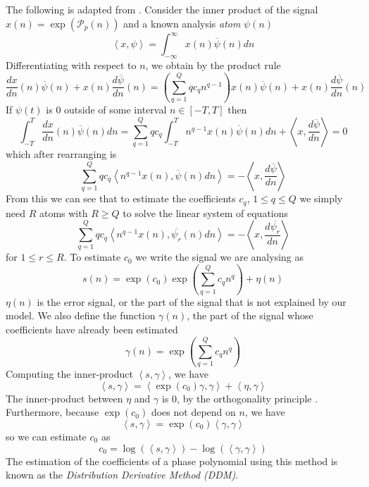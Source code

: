 The following is adapted from \cite{betser2009sinusoidal}. Consider the inner
product of the signal $x(n) = \exp(\mathcal{P}_p(n)) $ and a
known analysis \textit{atom} $\psi(n)$
\[
    \left\langle x,\psi \right\rangle =
    \int_{-\infty}^{\infty}x(n)\overline{\psi}(n)dn
\]
Differentiating with respect to $n$, we obtain by the product rule
\[
    \frac{dx}{dn}(n)\overline{\psi}(n)
    + x(n)\frac{d\overline{\psi}}{dn}(n)
    = \left( \sum_{q=1}^{Q} q c_q n^{q-1} \right) x(n)\overline{\psi}(n)
    + x(n)\frac{d\overline{\psi}}{dn}(n)
\]
If $\psi(t)$ is 0 outside of some interval $n \in [-T,T]$ then
\[
    \int_{-T}^{T} \frac{dx}{dn}(n)\overline{\psi}(n) dn
    = \sum_{q=1}^{Q} q c_q \int_{-T}^{T} n^{q-1} x(n) \overline{\psi}(n) dn
    + \left\langle x, \frac{d\overline{\psi}}{dn} \right\rangle = 0
\]
which after rearranging is
\[ 
    \sum_{q=1}^{Q} q c_q 
    \left\langle n^{q-1} x(n) , \overline{\psi}(n) dn \right\rangle
    = -\left\langle x, \frac{d\overline{\psi}}{dn} \right\rangle
\]
From this we can see that to estimate the coefficients $c_q$, $ 1 \leq q \leq Q
$ we simply need $R$ atoms with $R \geq Q$ to solve the linear system of
equations
\begin{equation}
    \label{eq:ddmsyseq}
    \sum_{q=1}^{Q} q c_q 
    \left\langle n^{q-1} x(n) , \overline{\psi_{r}}(n) dn \right\rangle
    = -\left\langle x, \frac{d\overline{\psi_{r}}}{dn} \right\rangle
\end{equation}
for $1 \leq r \leq R$. To estimate $c_0$ we write the signal we are analysing as
\[
    s(n) = \exp(c_0) \exp \left( \sum_{q=1}^{Q} c_q n^{q} \right) + \eta (n)
\]
$\eta (n)$ is the error signal, or the part of the signal that is not explained
by our model. We also define the function $\gamma (n)$, the part of the signal
whose coefficients have already been estimated
\[
    \gamma(n) = \exp \left( \sum_{q=1}^{Q} c_q n^{q} \right)
\]
Computing the inner-product $\left\langle s , \gamma \right\rangle$, we have
\[
    \left\langle s , \gamma \right\rangle
    =
    \left\langle \exp(c_0) \gamma , \gamma \right\rangle + 
        \left\langle \eta , \gamma \right\rangle
\]
The inner-product between $\eta$ and $\gamma$ is $0$, by the orthogonality
principle \cite{kay1993fundamentals}. Furthermore, because $\exp(c_0)$ does not
depend on $n$, we have
\[
    \left\langle s , \gamma \right\rangle
    =
    \exp(c_0) \left\langle \gamma , \gamma \right\rangle
\]
so we can estimate $c_0$ as
\begin{equation}
    \label{eq:ddmestc0}
    c_0 = \log \left( \left\langle s , \gamma \right\rangle \right)
        - \log \left( \left\langle \gamma , \gamma \right\rangle \right)
\end{equation}
The estimation of the coefficients of a phase polynomial
using this method is known as the \textit{Distribution Derivative Method (DDM)}.

